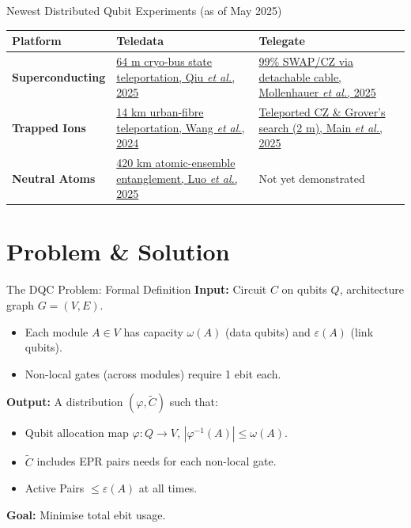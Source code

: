 \documentclass{beamer}
\begin{document}
	\begin{frame}{Newest Distributed Qubit Experiments (as of May 2025)}
		\scriptsize
		\begin{tabular}{@{}p{2.2cm}p{4.2cm}p{4.2cm}@{}}
			\toprule
			\textbf{Platform} & \textbf{Teledata} & \textbf{Telegate} \\ \midrule
			
			\textbf{Superconducting} 
			& \href{https://arxiv.org/abs/2302.08756}{64 m cryo-bus state teleportation, Qiu \emph{et al.}, 2025} 
			& \href{https://arxiv.org/abs/2407.16743}{\scriptsize99\% SWAP/CZ via detachable cable, Mollenhauer \emph{et al.}, 2025} \\
			
			\textbf{Trapped Ions} 
			& \href{https://www.nature.com/articles/s41534-024-00886-x}{14 km urban-fibre teleportation, Wang \emph{et al.}, 2024} 
			& \href{https://www.nature.com/articles/s41586-024-08404-x}{Teleported CZ \& Grover’s search (2 m), Main \emph{et al.}, 2025} \\
			
			\textbf{Neutral Atoms} 
			& \href{https://arxiv.org/abs/2504.05660}{420 km atomic-ensemble entanglement, Luo \emph{et al.}, 2025} 
			& Not yet demonstrated \\
			
			\bottomrule
		\end{tabular}
	\end{frame}
	\section{Problem \& Solution}
	
	\begin{frame}{The DQC Problem: Formal Definition}
		\textbf{Input:} Circuit $C$ on qubits $Q$, architecture graph $G=(V,E)$.
		
		\begin{itemize}
			\item Each module $A \in V$ has capacity $\omega(A)$ (data qubits) and $\varepsilon(A)$ (link qubits).
			\item Non-local gates (across modules) require 1 ebit each.
		\end{itemize}
		
		\textbf{Output:} A distribution $(\varphi, \tilde{C})$ such that:
		\begin{itemize}
			\item Qubit allocation map $\varphi: Q \rightarrow V$, $|\varphi^{-1}(A)| \le \omega(A)$.
			\item $\tilde{C}$ includes EPR pairs needs for each non-local gate.
			\item Active Pairs $\le \varepsilon(A)$ at all times.
		\end{itemize}
		
		\textbf{Goal:} Minimise total ebit usage.
	\end{frame}
	
\end{document}
